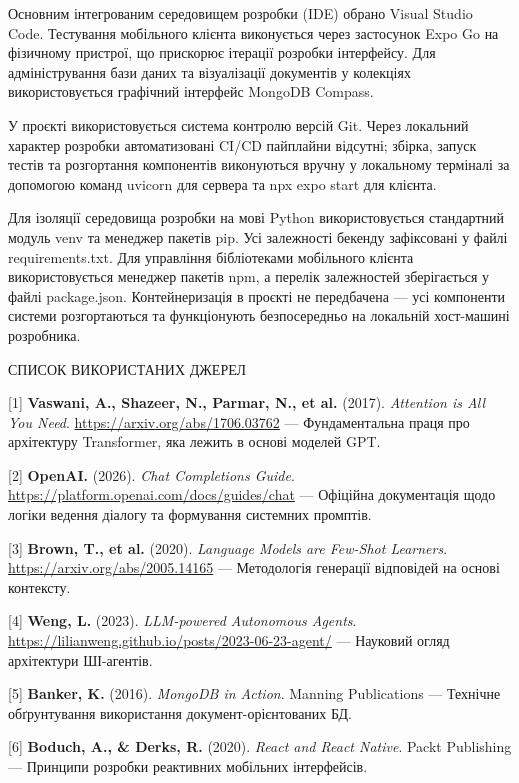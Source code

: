 \documentclass[
]{article}
\begin{document}
Основним інтегрованим середовищем розробки (IDE) обрано Visual Studio
Code. Тестування мобільного клієнта виконується через застосунок Expo Go
на фізичному пристрої, що прискорює ітерації розробки інтерфейсу. Для
адміністрування бази даних та візуалізації документів у колекціях
використовується графічний інтерфейс MongoDB Compass.

У проєкті використовується система контролю версій Git. Через локальний
характер розробки автоматизовані CI/CD пайплайни відсутні; збірка,
запуск тестів та розгортання компонентів виконуються вручну у локальному
терміналі за допомогою команд uvicorn для сервера та npx expo start для
клієнта.

Для ізоляції середовища розробки на мові Python використовується
стандартний модуль venv та менеджер пакетів pip. Усі залежності бекенду
зафіксовані у файлі requirements.txt. Для управління бібліотеками
мобільного клієнта використовується менеджер пакетів npm, а перелік
залежностей зберігається у файлі package.json. Контейнеризація в проєкті
не передбачена --- усі компоненти системи розгортаються та функціонують
безпосередньо на локальній хост-машині розробника.

\protect{}\label{_Toc228981066}{}СПИСОК ВИКОРИСТАНИХ ДЖЕРЕЛ

{[}1{]} \textbf{Vaswani, A., Shazeer, N., Parmar, N., et al.} (2017).
\emph{Attention is All You Need}. \url{https://arxiv.org/abs/1706.03762}
--- Фундаментальна праця про архітектуру Transformer, яка лежить в
основі моделей GPT.

{[}2{]} \textbf{OpenAI.} (2026). \emph{Chat Completions Guide}.
\url{https://platform.openai.com/docs/guides/chat} --- Офіційна
документація щодо логіки ведення діалогу та формування системних
промптів.

{[}3{]} \textbf{Brown, T., et al.} (2020). \emph{Language Models are
Few-Shot Learners}. \url{https://arxiv.org/abs/2005.14165} ---
Методологія генерації відповідей на основі контексту.

{[}4{]} \textbf{Weng, L.} (2023). \emph{LLM-powered Autonomous Agents}.
\url{https://lilianweng.github.io/posts/2023-06-23-agent/} --- Науковий
огляд архітектури ШІ-агентів.

{[}5{]} \textbf{Banker, K.} (2016). \emph{MongoDB in Action}. Manning
Publications --- Технічне обґрунтування використання
документ-орієнтованих БД.

{[}6{]} \textbf{Boduch, A., \& Derks, R.} (2020). \emph{React and React
Native}. Packt Publishing --- Принципи розробки реактивних мобільних
інтерфейсів.
\end{document}
